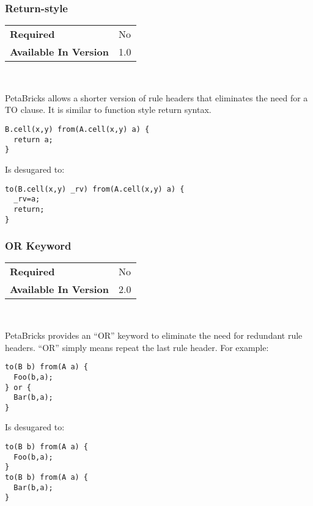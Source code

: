 \documentclass[11pt]{article}
\begin{document}
\subsubsection{Return-style}

\begin{tabular}{| l | l |}
\hline
\bf Required & No \\
\bf Available In Version & 1.0        \\
\hline
\end{tabular}

~

PetaBricks allows a shorter version of rule headers that eliminates
the need for a TO clause.  It is similar to function style return syntax.
 
\begin{minipage}{\linewidth}
\begin{lstlisting}
B.cell(x,y) from(A.cell(x,y) a) {
  return a;
}
\end{lstlisting}
\end{minipage}
Is desugared to:

\begin{minipage}{\linewidth}
\begin{lstlisting}
to(B.cell(x,y) _rv) from(A.cell(x,y) a) {
  _rv=a;
  return;
}
\end{lstlisting}
\end{minipage}

\subsubsection{OR Keyword}

\begin{tabular}{| l | l |}
\hline
\bf Required & No \\
\bf Available In Version & 2.0        \\
\hline
\end{tabular}

~

PetaBricks provides an ``OR'' keyword to eliminate the need for redundant 
rule headers.  ``OR'' simply means repeat the last rule header. For example:
 
\begin{minipage}{\linewidth}
\begin{lstlisting}
to(B b) from(A a) {
  Foo(b,a);
} or {
  Bar(b,a);
}
\end{lstlisting}
\end{minipage}
Is desugared to:

\begin{minipage}{\linewidth}
\begin{lstlisting}
to(B b) from(A a) {
  Foo(b,a);
}
to(B b) from(A a) {
  Bar(b,a);
}
\end{lstlisting}
\end{minipage}
\end{document}
